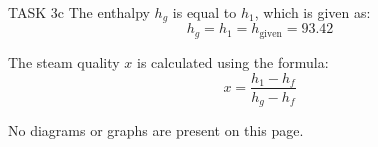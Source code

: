 TASK 3c  
The enthalpy \( h_g \) is equal to \( h_1 \), which is given as:  
\[
h_g = h_1 = h_{\text{given}} = 93.42
\]

The steam quality \( x \) is calculated using the formula:  
\[
x = \frac{h_1 - h_f}{h_{g} - h_f}
\]  

No diagrams or graphs are present on this page.